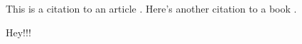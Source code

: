 



This is a citation to an article \cite{example2024}. Here's another citation to a book \cite{latexbook}.

\printbibliography %
Hey!!!

